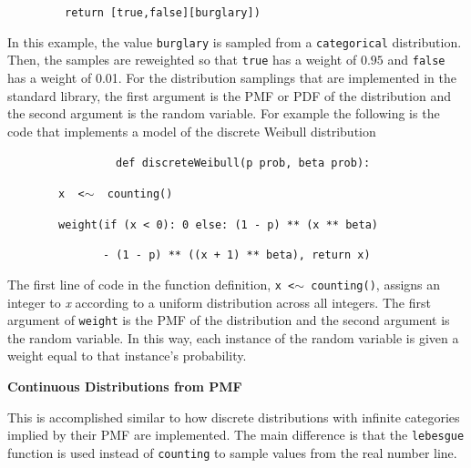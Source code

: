 \documentclass[22pt]{beamer}
\newenvironment{variableblock}[3]{%
  \setbeamercolor{block body}{#2}
  \setbeamercolor{block title}{#3}
  \begin{block}{#1}}{\end{block}}
\begin{document}
\begin{frame}[fragile]
\begin{textblock}{5}
\begin{variableblock}{}{}{}
\begin{center}
~~~~~~~~~\tt{\small{{\color{red}return} [{\color{red}true},{\color{red}false}][burglary])}}
\end{center}

\bigskip

\tiny{In this example, the value {\tt \tiny{burglary}} is sampled from a {\tt \tiny{categorical}} distribution. Then, the samples are reweighted so that {\tt \tiny{true}} has a weight of $0.95$ and {\tt \tiny{false}} has a weight of 0.01. For the distribution samplings that are implemented in the standard library, the first argument is the PMF or PDF of the distribution and the second argument is the random variable. For example the following is the code that implements a model of the discrete Weibull distribution}

\begin{center}
\justifying
~~~~~~~~~~~~~~~~~\tt{\small{{\color{red}def} {\color{blue}discreteWeibull}(p {\color{green}prob}, beta {\color{green}prob}):}}

~~~~~~~~\tt{\small {x {\color{green} <$\sim$} {\color{blue} counting}()}}

~~~~~~~~\tt{\small{{\color{blue}weight}({\color{red}if} (x {\color{green}<} {\color{purple}0}):~{\color{purple}0} {\color{red}else}:~({\color{purple}1}~{\color{green}-}~p)~{\color{green}**}~(x~{\color{green}**}~beta) }}

~~~~~~~~~~~~~~~\tt{\small{{\color{green}-} ({\color{purple}1~}{\color{green}-}~p){\color{green}~**~}((x{\color{green}~+}{\color{purple}~1}){\color{green}~**~}beta), {\color{red}return} x)}}
\end{center}

\bigskip

\tiny{The first line of code in the function definition, {\tt \tiny{x <$\sim$ counting()}}, assigns an integer to \textit{x} according to a uniform distribution across all integers.
The first argument of {\tt \tiny{weight}} is the PMF of the distribution and the second argument is the random variable. In this way, each instance of the random variable is given a weight equal to that instance's probability.
}

\small{\textbf{Continuous Distributions from PMF}}

\bigskip

\tiny{This is accomplished similar to how discrete distributions with infinite categories implied by their PMF are implemented. The main difference is that the {\tt \tiny{lebesgue}} function is used instead of {\tt \tiny{counting}} to sample values from the real number line.}



\end{variableblock}
\end{textblock}
\end{frame}
\end{document}
